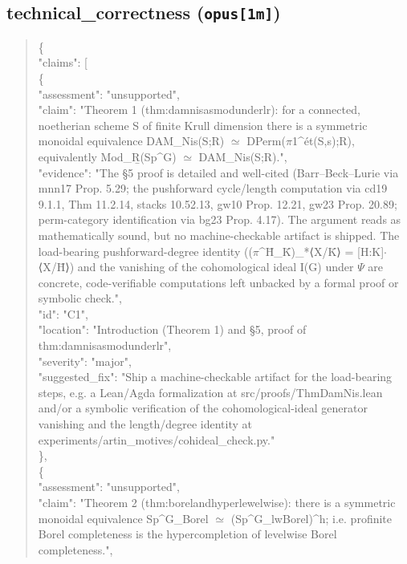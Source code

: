 \documentclass[11pt]{article}
\begin{document}
\subsection*{technical\_correctness (\texttt{opus[1m]})}
\begin{quote}\small\ttfamily\raggedright
\{\\
  "claims": [\\
    \{\\
      "assessment": "unsupported",\\
      "claim": "Theorem 1 (thm:damnisasmodunderlr): for a connected, noetherian scheme S of finite Krull dimension there is a symmetric monoidal equivalence DAM\_Nis(S;R) \ensuremath{\simeq} DPerm(\ensuremath{\pi}1\^{}ét(S,s);R), equivalently Mod\_R̲(Sp\^{}G) \ensuremath{\simeq} DAM\_Nis(S;R).",\\
      "evidence": "The §5 proof is detailed and well-cited (Barr--Beck--Lurie via mnn17 Prop. 5.29; the pushforward cycle/length computation via cd19 9.1.1, Thm 11.2.14, stacks 10.52.13, gw10 Prop. 12.21, gw23 Prop. 20.89; perm-category identification via bg23 Prop. 4.17). The argument reads as mathematically sound, but no machine-checkable artifact is shipped. The load-bearing pushforward-degree identity ((\ensuremath{\pi}\^{}H\={}\_K\={})\_*⟨X/K\={}⟩ = [H:K]\ensuremath{\cdot}⟨X/H\={}⟩) and the vanishing of the cohomological ideal I(G) under \ensuremath{\Psi} are concrete, code-verifiable computations left unbacked by a formal proof or symbolic check.",\\
      "id": "C1",\\
      "location": "Introduction (Theorem 1) and §5, proof of thm:damnisasmodunderlr",\\
      "severity": "major",\\
      "suggested\_fix": "Ship a machine-checkable artifact for the load-bearing steps, e.g. a Lean/Agda formalization at src/proofs/ThmDamNis.lean and/or a symbolic verification of the cohomological-ideal generator vanishing and the length/degree identity at experiments/artin\_motives/cohideal\_check.py."\\
    \},\\
    \{\\
      "assessment": "unsupported",\\
      "claim": "Theorem 2 (thm:borelandhyperlewelwise): there is a symmetric monoidal equivalence Sp\^{}G\_Borel \ensuremath{\simeq} (Sp\^{}G\_lwBorel)\^{}h; i.e. profinite Borel completeness is the hypercompletion of levelwise Borel completeness.",\\

\end{quote}
\end{document}
